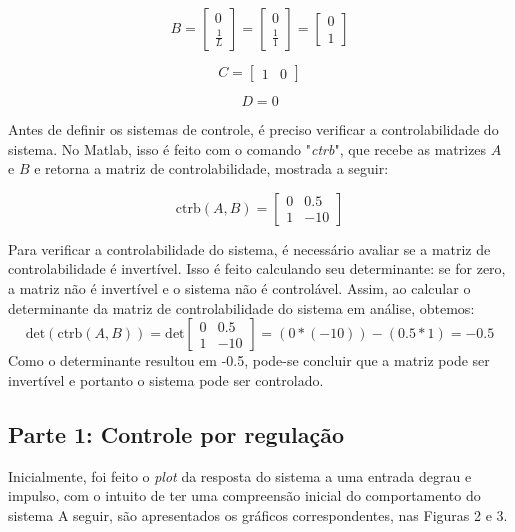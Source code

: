 \documentclass[a4paper, 12pt]{article}
\begin{document}
\begin{itemize}
    \[
    B = \begin{bmatrix}
    0 \\
    \frac{1}{L}
    \end{bmatrix} = \begin{bmatrix}
    0 \\
    \frac{1}{1}
    \end{bmatrix} = \begin{bmatrix}
    0 \\
    1
    \end{bmatrix}
    \]
        
    \[
    C = \begin{bmatrix}
    1 & 0
    \end{bmatrix}
    \]
     
    \[
    D = 0
    \]


    Antes de definir os sistemas de controle, é preciso verificar a controlabilidade do sistema. No Matlab, isso é feito com o comando "\textit{ctrb}", que recebe as matrizes \( A \) e \( B \) e retorna a matriz de controlabilidade, mostrada a seguir:

    \[
    \text{ctrb}(A,B) = \begin{bmatrix}
    0 & 0.5 \\
    1 & -10
    \end{bmatrix}
    \]

    Para verificar a controlabilidade do sistema, é necessário avaliar se a matriz de controlabilidade é invertível. Isso é feito calculando seu determinante: se for zero, a matriz não é invertível e o sistema não é controlável. Assim, ao calcular o determinante da matriz de controlabilidade do sistema em análise, obtemos:
    \[
    \text{det}(\text{ctrb}(A,B)) = \text{det} \begin{bmatrix}
    0 & 0.5 \\
    1 & -10
    \end{bmatrix} = (0 * (-10)) - (0.5 * 1) = -0.5
    \]
    Como o determinante resultou em -0.5, pode-se concluir que a matriz pode ser invertível e portanto o sistema pode ser controlado.

\subsection{Parte 1: Controle por regulação}
    Inicialmente, foi feito o \textit{plot} da resposta do sistema a uma entrada degrau e impulso, com o intuito de ter uma compreensão inicial do comportamento do sistema  A seguir, são apresentados os gráficos correspondentes, nas Figuras 2 e 3.



\end{itemize}
\end{document}
